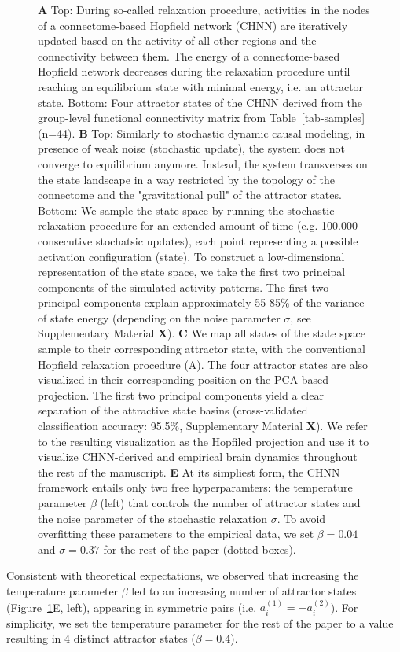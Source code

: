\documentclass{article}
\begin{document}
\begin{figure}[!htbp]
{\textbf{A} Top: During so-called relaxation procedure, activities in the nodes of a connectome-based Hopfield network (CHNN)
are iteratively updated based on the activity of all other regions and the connectivity between them. The energy of a
connectome-based Hopfield network decreases during the relaxation procedure until reaching an equilibrium state with
minimal energy, i.e. an attractor state. Bottom: Four attractor states of the CHNN derived from the
group-level functional connectivity matrix from Table~\ref{tab-samples} (n=44).
\textbf{B} Top: Similarly to stochastic dynamic causal modeling, in presence of weak noise (stochastic update), the system
does not converge to equilibrium anymore. Instead, the system transverses on the state landscape in a way
restricted by the topology of the connectome and the "gravitational pull" of the attractor states. Bottom: We sample
the state space by running the stochastic relaxation procedure for an extended amount of time (e.g. 100.000 consecutive
stochatsic updates), each point representing a possible activation configuration (state). To construct a
low-dimensional representation of the state space, we take the first two principal components of the simulated activity
patterns. The first two principal components explain approximately 55-85\% of the variance of state energy (depending
on the noise parameter $\sigma$, see Supplementary Material \textbf{X}).
\textbf{C} We map all states of the state space sample to their corresponding attractor state, with the conventional
Hopfield relaxation procedure (A). The four attractor states are also visualized in their corresponding position on the
PCA-based projection. The first two principal components yield a clear separation of the attractive state basins
(cross-validated classification accuracy: 95.5\%, Supplementary Material \textbf{X}). We refer to the resulting visualization
as the Hopfiled projection and use it to visualize CHNN-derived and empirical brain dynamics throughout the rest of
the manuscript.
\textbf{E} At its simpliest form, the CHNN framework entails only two free hyperparamters: the temperature parameter
$\beta$ (left) that controls the number of attractor states and the noise parameter of the stochastic relaxation
$\sigma$. To avoid overfitting these parameters to the empirical data, we set $\beta=0.04$ and $\sigma=0.37$ for the
rest of the paper  (dotted boxes).}
\label{attractors}
\end{figure}

Consistent with theoretical expectations, we observed that increasing the temperature parameter $\beta$ led to an
increasing number of attractor states (Figure~\ref{attractors}E, left), appearing in symmetric pairs
(i.e. $a_i^{(1)} = -a_i^{(2)}$). For simplicity, we set the temperature parameter for the rest of the paper to a value
resulting in 4 distinct attractor states ($\beta=0.4$).
\end{document}
